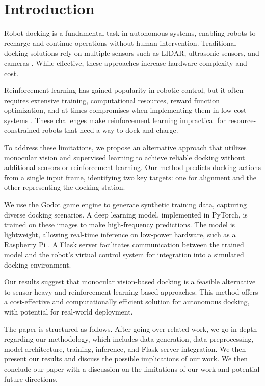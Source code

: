 \section{Introduction}
Robot docking is a fundamental task in autonomous systems, enabling robots to recharge and continue operations without human intervention. Traditional docking solutions rely on multiple sensors such as LIDAR, ultrasonic sensors, and cameras \citep{app131910675}. While effective, these approaches increase hardware complexity and cost.

Reinforcement learning has gained popularity in robotic control, but it often requires extensive training, computational resources, reward function optimization, and at times compromises when implementing them in low-cost systems \citep{Deisenroth2012}. These challenges make reinforcement learning impractical for resource-constrained robots that need a way to dock and charge.

To address these limitations, we propose an alternative approach that utilizes monocular vision and supervised learning to achieve reliable docking without additional sensors or reinforcement learning. Our method predicts docking actions from a single input frame, identifying two key targets: one for alignment and the other representing the docking station.

We use the Godot game engine to generate synthetic training data, capturing diverse docking scenarios. A deep learning model, implemented in PyTorch, is trained on these images to make high-frequency predictions. The model is lightweight, allowing real-time inference on low-power hardware, such as a Raspberry Pi \citep{ameen2023optimizingdeeplearningmodels}. A Flask server facilitates communication between the trained model and the robot’s virtual control system for integration into a simulated docking environment.

Our results suggest that monocular vision-based docking is a feasible alternative to sensor-heavy and reinforcement learning-based approaches. This method offers a cost-effective and computationally efficient solution for autonomous docking, with potential for real-world deployment.

The paper is structured as follows. After going over related work, we go in depth regarding our methodology, which includes data generation, data preprocessing, model architecture, training, inference, and Flask server integration. We then present our results and discuss the possible implications of our work. We then conclude our paper with a discussion on the limitations of our work and potential future directions.

